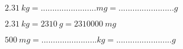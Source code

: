\begin{questions}
		
	
		
		
		\question $\num{2.31}\  kg =........................mg =........................g $\\
		\begin{solution}
			$\num{2.31}\  kg = \num{2310}\  g = \num{2310000}\  mg $
		\end{solution}
		
		
		
		
		\question $ \num{500}\  mg =........................kg =........................ g $\\
		
%		
%		
%		
%		
%		
%		

\end{questions}

